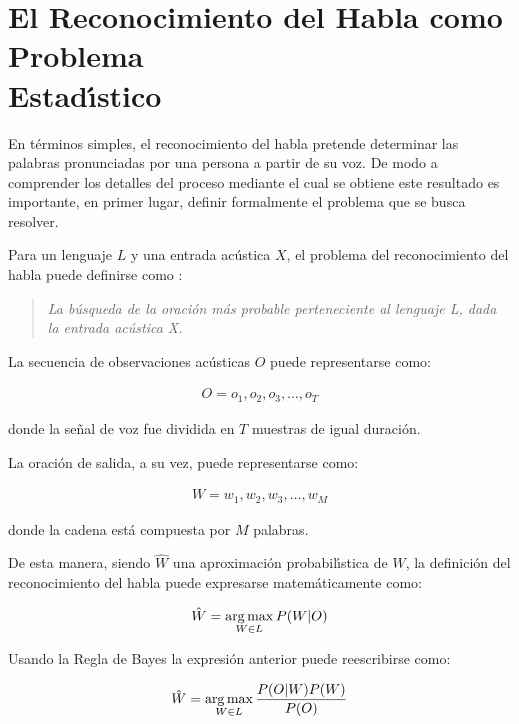 
\section[El Reconocimiento del Habla como Problema Estad{\'\i}stico]
{El Reconocimiento del Habla como Problema \\ Estad{\'\i}stico}
En t\'erminos simples, el reconocimiento del habla pretende determinar las palabras pronunciadas por una persona
a partir de su voz. De modo a comprender los detalles del proceso mediante el cual se obtiene este
resultado es importante, en primer lugar, definir formalmente el problema que se busca resolver.

Para un lenguaje $L$ y una entrada ac\'ustica $X$, el problema del reconocimiento del habla puede definirse 
como \cite{Jurafsky}:

\begin{quote}
\emph{La b\'usqueda de la oraci\'on m\'as probable perteneciente al lenguaje L, dada la entrada ac\'ustica X.}
\end{quote}

La secuencia de observaciones ac\'usticas $O$ puede representarse como:

\begin{align}
O = o_1,o_2,o_3,\ldots,o_T\label{eq:asrO}
\end{align}

donde la se\~nal de voz fue dividida en $T$ muestras de igual duraci\'on.

La oraci\'on de salida, a su vez, puede representarse como:

\begin{align}
W  = w_1,w_2,w_3,\ldots,w_M\label{eq:asrW}
\end{align}

donde la cadena est\'a compuesta por $M$ palabras.

De esta manera, siendo $\hat{W}$ una aproximaci\'on probabil{\'\i}stica de $W$, la definici\'on del reconocimiento del habla puede expresarse matem\'aticamente como:

\begin{align}
\hat{W} = \operatorname*{arg\,max}_{W \in L} P(W|O)
\end{align}

Usando la Regla de Bayes la expresi\'on anterior puede reescribirse como:

\begin{align}
\hat{W} = \operatorname*{arg\,max}_{W \in L} \frac{P(O|W)P(W)}{P(O)}
\end{align}

